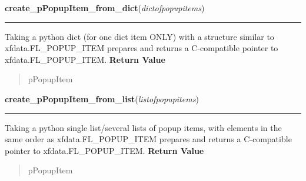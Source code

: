     \label{xformslib:library:create_pPopupItem_from_dict}

    \vspace{0.5ex}

\hspace{.8\funcindent}\begin{boxedminipage}{\funcwidth}

    \raggedright \textbf{create\_pPopupItem\_from\_dict}(\textit{dictofpopupitems})

    \vspace{-1.5ex}

    \rule{\textwidth}{0.5\fboxrule}
\setlength{\parskip}{2ex}

Taking a python dict (for one dict item ONLY) with a structure similar
to xfdata.FL\_POPUP\_ITEM prepares and returns a C-compatible pointer
to xfdata.FL\_POPUP\_ITEM.
\setlength{\parskip}{1ex}
      \textbf{Return Value}
    \vspace{-1ex}

      \begin{quote}

pPopupItem
      \end{quote}

    \end{boxedminipage}

    \label{xformslib:library:create_pPopupItem_from_list}

    \vspace{0.5ex}

\hspace{.8\funcindent}\begin{boxedminipage}{\funcwidth}

    \raggedright \textbf{create\_pPopupItem\_from\_list}(\textit{listofpopupitems})

    \vspace{-1.5ex}

    \rule{\textwidth}{0.5\fboxrule}
\setlength{\parskip}{2ex}

Taking a python single list/several lists of popup items, with
elements in the same order as xfdata.FL\_POPUP\_ITEM prepares and
returns a C-compatible pointer to xfdata.FL\_POPUP\_ITEM.
\setlength{\parskip}{1ex}
      \textbf{Return Value}
    \vspace{-1ex}

      \begin{quote}

pPopupItem
      \end{quote}

    \end{boxedminipage}



